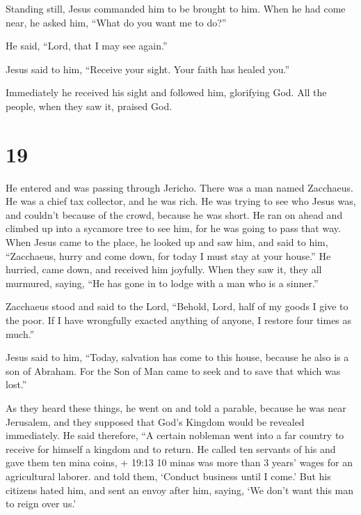  Standing still, Jesus commanded him to be brought to him.
When he had come near, he asked him,  ``What do you want me
to do?''

He said, ``Lord, that I may see again.''

 Jesus said to him, ``Receive your sight. Your faith has
healed you.''

 Immediately he received his sight and followed him,
glorifying God. All the people, when they saw it, praised God.

\hypertarget{section-18}{%
\section{19}\label{section-18}}

 He entered and was passing through Jericho. 
There was a man named Zacchaeus. He was a chief tax collector, and he
was rich.  He was trying to see who Jesus was, and couldn't
because of the crowd, because he was short.  He ran on ahead
and climbed up into a sycamore tree to see him, for he was going to pass
that way.  When Jesus came to the place, he looked up and
saw him, and said to him, ``Zacchaeus, hurry and come down, for today I
must stay at your house.''  He hurried, came down, and
received him joyfully.  When they saw it, they all murmured,
saying, ``He has gone in to lodge with a man who is a sinner.''

 Zacchaeus stood and said to the Lord, ``Behold, Lord, half
of my goods I give to the poor. If I have wrongfully exacted anything of
anyone, I restore four times as much.''

 Jesus said to him, ``Today, salvation has come to this
house, because he also is a son of Abraham.  For the Son of
Man came to seek and to save that which was lost.''

 As they heard these things, he went on and told a parable,
because he was near Jerusalem, and they supposed that God's Kingdom
would be revealed immediately.  He said therefore, ``A
certain nobleman went into a far country to receive for himself a
kingdom and to return.  He called ten servants of his and
gave them ten mina coins, + 19:13 10 minas was more than 3 years' wages
for an agricultural laborer. and told them, `Conduct business until I
come.'  But his citizens hated him, and sent an envoy after
him, saying, `We don't want this man to reign over us.'

